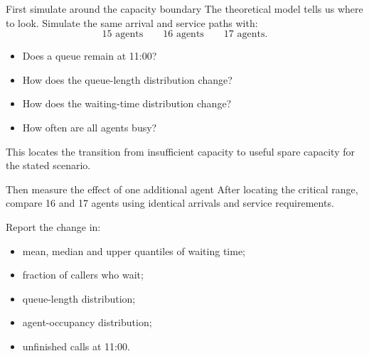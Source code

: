 \documentclass{beamer}
\begin{document}
\begin{frame}{First simulate around the capacity boundary}
  The theoretical model tells us where to look. Simulate the same arrival and
  service paths with:
  \[
    15\text{ agents}\qquad 16\text{ agents}\qquad 17\text{ agents}.
  \]
  \begin{itemize}
    \item Does a queue remain at 11:00?
    \item How does the queue-length distribution change?
    \item How does the waiting-time distribution change?
    \item How often are all agents busy?
  \end{itemize}
  \vspace{0.4em}
  This locates the transition from insufficient capacity to useful spare
  capacity for the stated scenario.
\end{frame}

\begin{frame}{Then measure the effect of one additional agent}
  After locating the critical range, compare 16 and 17 agents using identical
  arrivals and service requirements.
  \vspace{0.5em}

  Report the change in:
  \begin{itemize}
    \item mean, median and upper quantiles of waiting time;
    \item fraction of callers who wait;
    \item queue-length distribution;
    \item agent-occupancy distribution;
    \item unfinished calls at 11:00.
  \end{itemize}
\end{frame}
\end{document}
